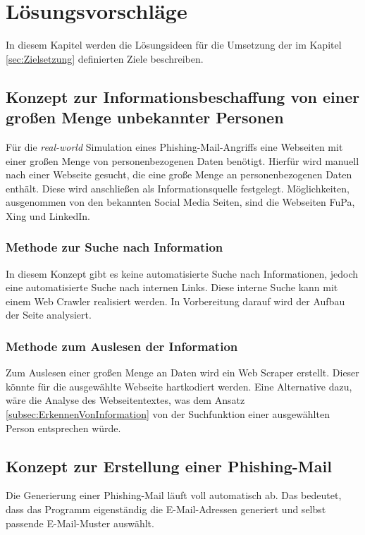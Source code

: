 
\chapter{Lösungsvorschläge}  %
\label{cha:Lösungsideen} %
In diesem Kapitel werden die Lösungsideen für die Umsetzung der im Kapitel \ref{sec:Zielsetzung} definierten Ziele beschreiben.


	
\section{Konzept zur Informationsbeschaffung von einer großen Menge unbekannter Personen}
Für die \textit{real-world} Simulation eines Phishing-Mail-Angriffs eine Webseiten mit einer großen Menge von personenbezogenen Daten benötigt. 	Hierfür wird manuell nach einer Webseite gesucht, die eine große Menge an personenbezogenen Daten enthält. Diese wird anschließen als Informationsquelle festgelegt. Möglichkeiten, ausgenommen von den bekannten Social Media Seiten, sind die Webseiten FuPa, Xing und LinkedIn.\\
	\subsection{Methode zur Suche nach Information}
	In diesem Konzept gibt es keine automatisierte Suche nach Informationen, jedoch eine automatisierte Suche nach internen Links. Diese interne Suche kann mit einem Web Crawler realisiert werden. In Vorbereitung darauf wird der Aufbau der Seite analysiert.\\
	
	\subsection{Methode zum Auslesen der Information}
	Zum Auslesen einer großen Menge an Daten wird ein Web Scraper erstellt. Dieser könnte für die ausgewählte Webseite hartkodiert werden. Eine Alternative dazu, wäre die Analyse des Webseitentextes, was dem Ansatz \ref{subsec:ErkennenVonInformation} von der Suchfunktion einer ausgewählten Person entsprechen würde.

\section{Konzept zur Erstellung einer Phishing-Mail}
Die Generierung einer Phishing-Mail läuft voll automatisch ab. Das bedeutet, dass das Programm eigenständig die E-Mail-Adressen generiert und selbst passende E-Mail-Muster auswählt.

